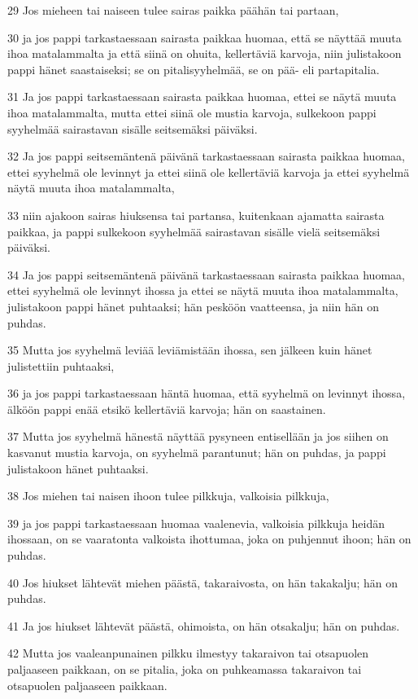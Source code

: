 \par 29 Jos mieheen tai naiseen tulee sairas paikka päähän tai partaan,
\par 30 ja jos pappi tarkastaessaan sairasta paikkaa huomaa, että se näyttää muuta ihoa matalammalta ja että siinä on ohuita, kellertäviä karvoja, niin julistakoon pappi hänet saastaiseksi; se on pitalisyyhelmää, se on pää- eli partapitalia.
\par 31 Ja jos pappi tarkastaessaan sairasta paikkaa huomaa, ettei se näytä muuta ihoa matalammalta, mutta ettei siinä ole mustia karvoja, sulkekoon pappi syyhelmää sairastavan sisälle seitsemäksi päiväksi.
\par 32 Ja jos pappi seitsemäntenä päivänä tarkastaessaan sairasta paikkaa huomaa, ettei syyhelmä ole levinnyt ja ettei siinä ole kellertäviä karvoja ja ettei syyhelmä näytä muuta ihoa matalammalta,
\par 33 niin ajakoon sairas hiuksensa tai partansa, kuitenkaan ajamatta sairasta paikkaa, ja pappi sulkekoon syyhelmää sairastavan sisälle vielä seitsemäksi päiväksi.
\par 34 Ja jos pappi seitsemäntenä päivänä tarkastaessaan sairasta paikkaa huomaa, ettei syyhelmä ole levinnyt ihossa ja ettei se näytä muuta ihoa matalammalta, julistakoon pappi hänet puhtaaksi; hän pesköön vaatteensa, ja niin hän on puhdas.
\par 35 Mutta jos syyhelmä leviää leviämistään ihossa, sen jälkeen kuin hänet julistettiin puhtaaksi,
\par 36 ja jos pappi tarkastaessaan häntä huomaa, että syyhelmä on levinnyt ihossa, älköön pappi enää etsikö kellertäviä karvoja; hän on saastainen.
\par 37 Mutta jos syyhelmä hänestä näyttää pysyneen entisellään ja jos siihen on kasvanut mustia karvoja, on syyhelmä parantunut; hän on puhdas, ja pappi julistakoon hänet puhtaaksi.
\par 38 Jos miehen tai naisen ihoon tulee pilkkuja, valkoisia pilkkuja,
\par 39 ja jos pappi tarkastaessaan huomaa vaalenevia, valkoisia pilkkuja heidän ihossaan, on se vaaratonta valkoista ihottumaa, joka on puhjennut ihoon; hän on puhdas.
\par 40 Jos hiukset lähtevät miehen päästä, takaraivosta, on hän takakalju; hän on puhdas.
\par 41 Ja jos hiukset lähtevät päästä, ohimoista, on hän otsakalju; hän on puhdas.
\par 42 Mutta jos vaaleanpunainen pilkku ilmestyy takaraivon tai otsapuolen paljaaseen paikkaan, on se pitalia, joka on puhkeamassa takaraivon tai otsapuolen paljaaseen paikkaan.
